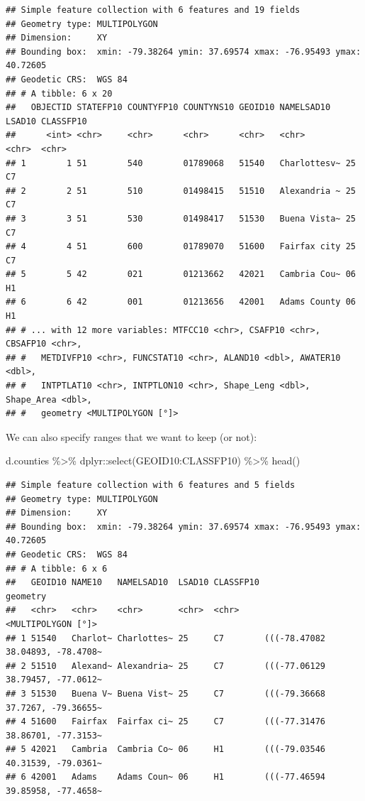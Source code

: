\documentclass[]{article}
\newenvironment{Shaded}{\begin{snugshade}}{\end{snugshade}}
\newcommand{\FunctionTok}[1]{\textcolor[rgb]{0.00,0.00,0.00}{#1}}
\newcommand{\NormalTok}[1]{#1}
\newcommand{\SpecialCharTok}[1]{\textcolor[rgb]{0.00,0.00,0.00}{#1}}
\begin{document}
\begin{verbatim}
## Simple feature collection with 6 features and 19 fields
## Geometry type: MULTIPOLYGON
## Dimension:     XY
## Bounding box:  xmin: -79.38264 ymin: 37.69574 xmax: -76.95493 ymax: 40.72605
## Geodetic CRS:  WGS 84
## # A tibble: 6 x 20
##   OBJECTID STATEFP10 COUNTYFP10 COUNTYNS10 GEOID10 NAMELSAD10   LSAD10 CLASSFP10
##      <int> <chr>     <chr>      <chr>      <chr>   <chr>        <chr>  <chr>    
## 1        1 51        540        01789068   51540   Charlottesv~ 25     C7       
## 2        2 51        510        01498415   51510   Alexandria ~ 25     C7       
## 3        3 51        530        01498417   51530   Buena Vista~ 25     C7       
## 4        4 51        600        01789070   51600   Fairfax city 25     C7       
## 5        5 42        021        01213662   42021   Cambria Cou~ 06     H1       
## 6        6 42        001        01213656   42001   Adams County 06     H1       
## # ... with 12 more variables: MTFCC10 <chr>, CSAFP10 <chr>, CBSAFP10 <chr>,
## #   METDIVFP10 <chr>, FUNCSTAT10 <chr>, ALAND10 <dbl>, AWATER10 <dbl>,
## #   INTPTLAT10 <chr>, INTPTLON10 <chr>, Shape_Leng <dbl>, Shape_Area <dbl>,
## #   geometry <MULTIPOLYGON [°]>
\end{verbatim}

We can also specify ranges that we want to keep (or not):

\begin{Shaded}
\begin{Highlighting}[]
\NormalTok{d.counties }\SpecialCharTok{\%\textgreater{}\%}\NormalTok{ dplyr}\SpecialCharTok{::}\FunctionTok{select}\NormalTok{(GEOID10}\SpecialCharTok{:}\NormalTok{CLASSFP10) }\SpecialCharTok{\%\textgreater{}\%} \FunctionTok{head}\NormalTok{() }
\end{Highlighting}
\end{Shaded}

\begin{verbatim}
## Simple feature collection with 6 features and 5 fields
## Geometry type: MULTIPOLYGON
## Dimension:     XY
## Bounding box:  xmin: -79.38264 ymin: 37.69574 xmax: -76.95493 ymax: 40.72605
## Geodetic CRS:  WGS 84
## # A tibble: 6 x 6
##   GEOID10 NAME10   NAMELSAD10  LSAD10 CLASSFP10                         geometry
##   <chr>   <chr>    <chr>       <chr>  <chr>                   <MULTIPOLYGON [°]>
## 1 51540   Charlot~ Charlottes~ 25     C7        (((-78.47082 38.04893, -78.4708~
## 2 51510   Alexand~ Alexandria~ 25     C7        (((-77.06129 38.79457, -77.0612~
## 3 51530   Buena V~ Buena Vist~ 25     C7        (((-79.36668 37.7267, -79.36655~
## 4 51600   Fairfax  Fairfax ci~ 25     C7        (((-77.31476 38.86701, -77.3153~
## 5 42021   Cambria  Cambria Co~ 06     H1        (((-79.03546 40.31539, -79.0361~
## 6 42001   Adams    Adams Coun~ 06     H1        (((-77.46594 39.85958, -77.4658~
\end{verbatim}
\end{document}
